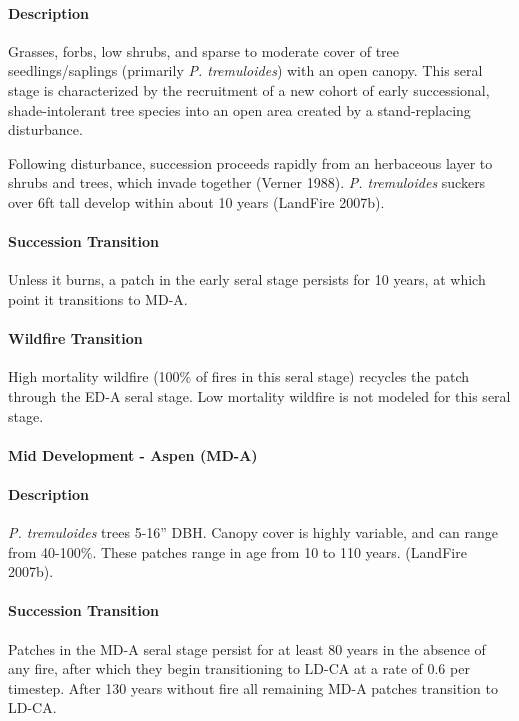 \paragraph{Description} Grasses, forbs, low shrubs, and sparse to moderate cover of tree seedlings/saplings (primarily \emph{P. tremuloides}) with an open canopy. This seral stage is characterized by the recruitment of a new cohort of early successional, shade-intolerant tree species into an open area created by a stand-replacing disturbance. 

Following disturbance, succession proceeds rapidly from an herbaceous layer to shrubs and trees, which invade together (Verner 1988). \emph{P. tremuloides} suckers over 6ft tall develop within about 10 years (LandFire 2007b). 

\paragraph{Succession Transition} Unless it burns, a patch in the early seral stage persists for 10 years, at which point it transitions to MD-A.

\paragraph{Wildfire Transition} High mortality wildfire (100\% of fires in this seral stage) recycles the patch through the ED-A seral stage. Low mortality wildfire is not modeled for this seral stage.

\noindent\hrulefill


\paragraph{Mid Development - Aspen (MD-A)}

\paragraph{Description} \emph{P. tremuloides} trees 5-16'' DBH. Canopy cover is highly variable, and can range from 40-100\%. These patches range in age from 10 to 110 years. (LandFire 2007b).

\paragraph{Succession Transition} Patches in the MD-A seral stage persist for at least 80 years in the absence of any fire, after which they begin transitioning to LD-CA at a rate of 0.6 per timestep. After 130 years without fire all remaining MD-A patches transition to LD-CA. 

